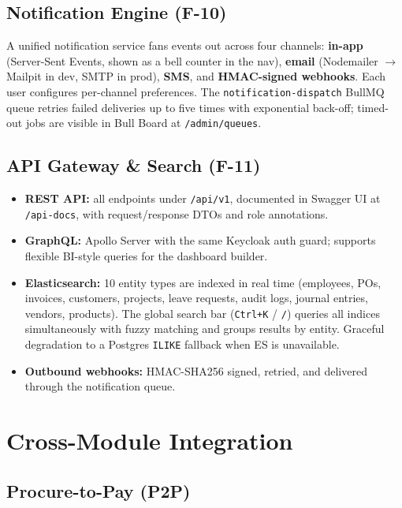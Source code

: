 \documentclass[11pt,a4paper]{article}
\newcommand{\code}[1]{\texttt{\small #1}}
\begin{document}
\subsection{Notification Engine (F-10)}

A unified notification service fans events out across four channels:
\textbf{in-app} (Server-Sent Events, shown as a bell counter in the nav),
\textbf{email} (Nodemailer $\rightarrow$ Mailpit in dev, SMTP in prod),
\textbf{SMS}, and \textbf{HMAC-signed webhooks}.
Each user configures per-channel preferences. The \code{notification-dispatch} BullMQ
queue retries failed deliveries up to five times with exponential back-off; timed-out
jobs are visible in Bull Board at \code{/admin/queues}.

\subsection{API Gateway \& Search (F-11)}

\begin{itemize}
  \item \textbf{REST API:} all endpoints under \code{/api/v1}, documented in Swagger UI
  at \code{/api-docs}, with request/response DTOs and role annotations.
  \item \textbf{GraphQL:} Apollo Server with the same Keycloak auth guard; supports
  flexible BI-style queries for the dashboard builder.
  \item \textbf{Elasticsearch:} 10 entity types are indexed in real time
  (employees, POs, invoices, customers, projects, leave requests, audit logs, journal
  entries, vendors, products). The global search bar (\code{Ctrl+K} / \code{/})
  queries all indices simultaneously with fuzzy matching and groups results by entity.
  Graceful degradation to a Postgres \code{ILIKE} fallback when ES is unavailable.
  \item \textbf{Outbound webhooks:} HMAC-SHA256 signed, retried, and delivered through
  the notification queue.
\end{itemize}

\section{Cross-Module Integration}\label{sec:integration}

\subsection{Procure-to-Pay (P2P)}
\end{document}

